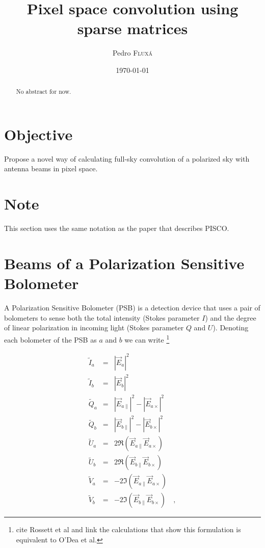 \documentclass[11pt]{article}
\title{Pixel space convolution using sparse matrices} %
\author{Pedro \textsc{Flux\'a}} %
\date{\today} %
\begin{document}
\pagestyle{plain}
\maketitle
\setlength{\parindent}{0pt}
\begin{abstract} No abstract for now.
	\vspace{.3in} 
\end{abstract}

\section{Objective}
	
	Propose a novel way of calculating full-sky convolution of a polarized sky with antenna beams in pixel space.
	
\section*{Note}
	
This section uses the same notation as the paper that describes PISCO.
	
\section{Beams of a Polarization Sensitive Bolometer}
	
A Polarization Sensitive Bolometer (PSB) is a detection device that uses a pair of bolometers to sense both the total intensity (Stokes parameter $I$) and the degree of linear polarization in incoming light (Stokes parameter $Q$ and $U$). Denoting each bolometer of the PSB as $a$ and $b$ we can write \footnote{cite Rossett et al and link the calculations that show this formulation is equivalent to O'Dea et al.}
	
\begin{eqnarray}
	\tilde{I}_{a} &=& |\vec{E}_{a}|^2 \\
	\tilde{I}_{b} &=& |\vec{E}_{b}|^2 \\
	\tilde{Q}_{a} &=& |\vec{E}_{a \parallel}|^2 - |\vec{E}_{a \times}|^2 \\
	\tilde{Q}_{b} &=& |\vec{E}_{b \parallel}|^2 - |\vec{E}_{b \times}|^2 \\
	\tilde{U}_{a} &=& 2 \Re{\left( \vec{E}_{a \parallel} \vec{E}_{a \times} \right)} \\
	\tilde{U}_{b} &=& 2 \Re{\left( \vec{E}_{b \parallel} \vec{E}_{b \times} \right)} \\
	\tilde{V}_{a} &=& -2 \Im{\left( \vec{E}_{a \parallel} \vec{E}_{a \times} \right)} \\
	\tilde{V}_{b} &=& -2 \Im{\left( \vec{E}_{b \parallel} \vec{E}_{b \times} \right)} \quad ,
\end{eqnarray}
\end{document}
